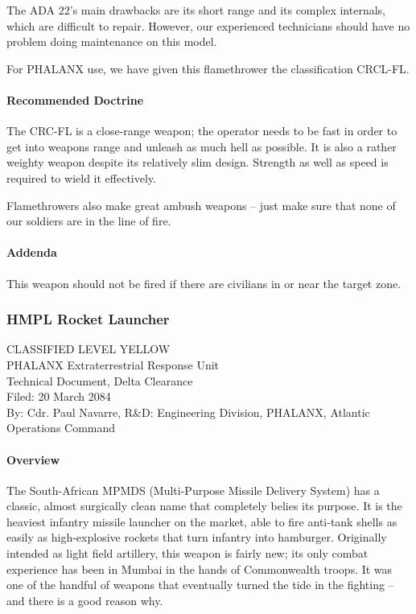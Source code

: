 The ADA 22's main drawbacks are its short range and its complex internals, which are difficult to repair. However, our experienced technicians should have no problem doing maintenance on this model.

For PHALANX use, we have given this flamethrower the classification CRCL-FL.
\paragraph*{Recommended Doctrine}
The CRC-FL is a close-range weapon; the operator needs to be fast in order to get into weapons range and unleash as much hell as possible. It is also a rather weighty weapon despite its relatively slim design. Strength as well as speed is required to wield it effectively.

Flamethrowers also make great ambush weapons -- just make sure that none of our soldiers are in the line of fire.
\paragraph*{Addenda}
This weapon should not be fired if there are civilians in or near the target zone. 
\subsubsection*{HMPL Rocket Launcher}
CLASSIFIED LEVEL YELLOW\\
PHALANX Extraterrestrial Response Unit\\
Technical Document, Delta Clearance\\
Filed: 20 March 2084\\
By: Cdr. Paul Navarre, R&D: Engineering Division, PHALANX, Atlantic Operations Command\\
\paragraph*{Overview}
The South-African MPMDS (Multi-Purpose Missile Delivery System) has a classic, almost surgically clean name that completely belies its purpose. It is the heaviest infantry missile launcher on the market, able to fire anti-tank shells as easily as high-explosive rockets that turn infantry into hamburger. Originally intended as light field artillery, this weapon is fairly new; its only combat experience has been in Mumbai in the hands of Commonwealth troops. It was one of the handful of weapons that eventually turned the tide in the fighting -- and there is a good reason why.


